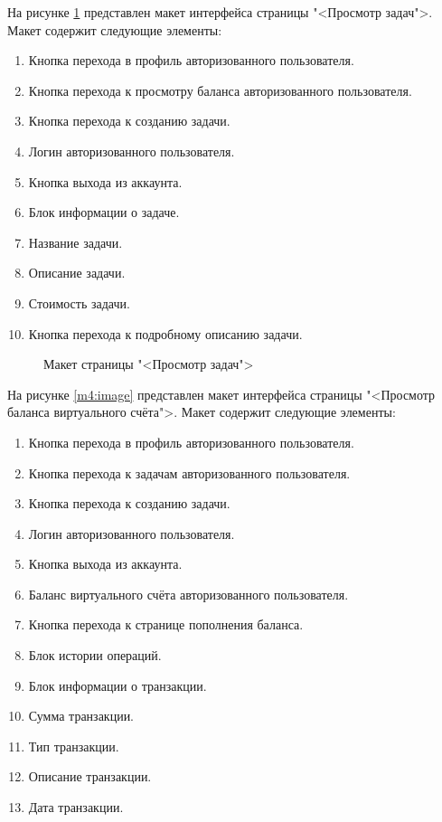 На рисунке \ref{m3:image} представлен макет интерфейса страницы "<Просмотр задач">. Макет содержит следующие элементы:

\begin{enumerate}
	\item Кнопка перехода в профиль авторизованного пользователя.
	\item Кнопка перехода к просмотру баланса авторизованного пользователя.
	\item Кнопка перехода к созданию задачи.
	\item Логин авторизованного пользователя.
	\item Кнопка выхода из аккаунта.
	\item Блок информации о задаче.
	\item Название задачи.
	\item Описание задачи.
	\item Стоимость задачи.
	\item Кнопка перехода к подробному описанию задачи.
\end{enumerate}
\clearpage

\begin{figure}[ht]
	\caption{Макет страницы "<Просмотр задач">}
	\label{m3:image}
\end{figure}

На рисунке \ref{m4:image} представлен макет интерфейса страницы "<Просмотр баланса виртуального счёта">. Макет содержит следующие элементы:

\begin{enumerate}
	\item Кнопка перехода в профиль авторизованного пользователя.
	\item Кнопка перехода к задачам авторизованного пользователя.
	\item Кнопка перехода к созданию задачи.
	\item Логин авторизованного пользователя.
	\item Кнопка выхода из аккаунта.
	\item Баланс виртуального счёта авторизованного пользователя.
	\item Кнопка перехода к странице пополнения баланса.
	\item Блок истории операций.
	\item Блок информации о транзакции.
	\item Сумма транзакции.
	\item Тип транзакции.
	\item Описание транзакции.
	\item Дата транзакции.
\end{enumerate}
\clearpage

